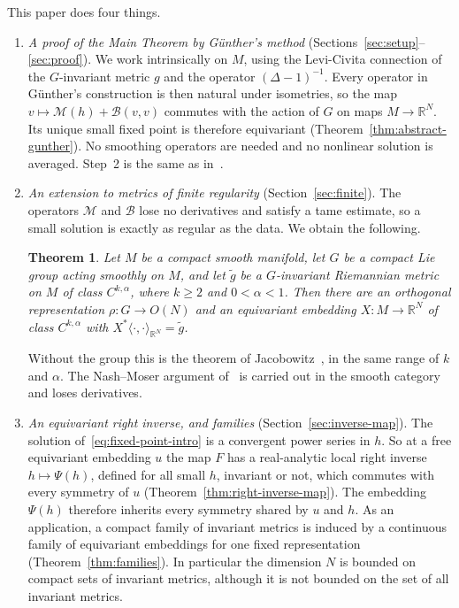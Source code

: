 \documentclass[11pt]{amsart}
\newtheorem{theorem}{Theorem}[section]
\theoremstyle{definition}
\newcommand{\R}{\mathbb{R}}
\newcommand{\inner}[2]{\langle #1, #2\rangle}
\newcommand{\cM}{\mathcal{M}}
\newcommand{\cB}{\mathcal{B}}
\begin{document}
This paper does four things.

\begin{enumerate}[label=(\arabic*)]
\item \emph{A proof of the Main Theorem by G\"unther's method}
(Sections~\ref{sec:setup}--\ref{sec:proof}). We work intrinsically on $M$, using the Levi-Civita
connection of the $G$-invariant metric $g$ and the operator $(\Delta-1)^{-1}$. Every operator in
G\"unther's construction is then natural under isometries, so the map
$v\mapsto\cM(h)+\cB(v,v)$ commutes with the action of $G$ on maps $M\to\R^N$. Its unique small
fixed point is therefore equivariant (Theorem~\ref{thm:abstract-gunther}). No smoothing operators
are needed and no nonlinear solution is averaged. Step~2 is the same as in~\cite{MS80}.

\item \emph{An extension to metrics of finite regularity} (Section~\ref{sec:finite}). The
operators $\cM$ and $\cB$ lose no derivatives and satisfy a tame estimate, so a small solution is
exactly as regular as the data. We obtain the following.

\begin{theorem}\label{thm:finite-intro}
Let $M$ be a compact smooth manifold, let $G$ be a compact Lie group acting smoothly on $M$, and
let $\tilde g$ be a $G$-invariant Riemannian metric on $M$ of class $C^{k,\alpha}$, where $k\ge2$
and $0<\alpha<1$. Then there are an orthogonal representation $\rho\colon G\to O(N)$ and an
equivariant embedding $X\colon M\to\R^N$ of class $C^{k,\alpha}$ with
$X^*\inner{\cdot}{\cdot}_{\R^N}=\tilde g$.
\end{theorem}

Without the group this is the theorem of Jacobowitz~\cite{Jacobowitz72}, in the same range of
$k$ and $\alpha$. The Nash--Moser argument of~\cite{MS80} is carried out in the smooth category
and loses derivatives.

\item \emph{An equivariant right inverse, and families} (Section~\ref{sec:inverse-map}). The
solution of~\eqref{eq:fixed-point-intro} is a convergent power series in $h$. So at a free
equivariant embedding $u$ the map $F$ has a real-analytic local right inverse
$h\mapsto\Psi(h)$, defined for all small $h$, invariant or not, which commutes with every symmetry
of $u$ (Theorem~\ref{thm:right-inverse-map}). The embedding $\Psi(h)$ therefore inherits every
symmetry shared by $u$ and $h$. As an application, a compact family of invariant metrics is
induced by a continuous family of equivariant embeddings for one fixed representation
(Theorem~\ref{thm:families}). In particular the dimension $N$ is bounded on compact sets of
invariant metrics, although it is not bounded on the set of all invariant metrics.


\end{enumerate}
\end{document}
